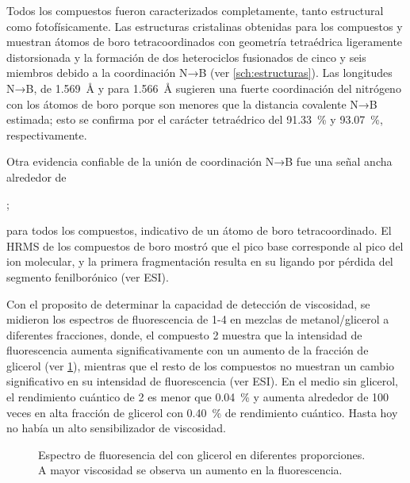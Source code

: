 


Todos los compuestos fueron caracterizados completamente, tanto estructural como fotofísicamente. Las estructuras cristalinas obtenidas para los compuestos  y  muestran átomos de boro tetracoordinados con geometría tetraédrica ligeramente distorsionada y la formación de dos heterociclos fusionados de cinco y seis miembros debido a la coordinación N→B (ver \cref{sch:estructuras}). Las longitudes N→B,  de \qty{1.569}{\angstrom} y para  \qty{1.566}{\angstrom} sugieren una fuerte coordinación del nitrógeno con los átomos de boro porque son menores que la distancia covalente N→B estimada; esto se confirma por el carácter tetraédrico del \qty{91.33}{\percent} y \qty{93.07}{\percent}, respectivamente.

Otra evidencia confiable de la unión de coordinación N→B fue una señal ancha alrededor de \begin{experimental}  ; \end{experimental} para todos los compuestos, indicativo de un átomo de boro tetracoordinado. El HRMS de los compuestos de boro mostró que el pico base corresponde al pico del ion molecular, y la primera fragmentación resulta en su ligando por pérdida del segmento fenilborónico (ver ESI). 


Con el proposito de determinar la capacidad de detección de viscosidad, se midieron los espectros de fluorescencia de 1-4 en mezclas de metanol/glicerol a diferentes fracciones, donde, el compuesto 2 muestra que la intensidad de fluorescencia aumenta significativamente con un aumento de la fracción de glicerol (ver \cref{fig:fluorescencia-glicerol}), mientras que el resto de los compuestos no muestran un cambio significativo en su intensidad de fluorescencia (ver ESI). En el medio sin glicerol, el rendimiento cuántico de 2 es menor que \qty{0.04}{\percent} y aumenta alrededor de 100 veces en alta fracción de glicerol con \qty{0.40}{\percent} de rendimiento cuántico. Hasta hoy no había un alto sensibilizador de viscosidad.

\begin{figure}
    \centering
    \label{fig:fluorescencia-glicerol}
    \caption{Espectro de fluoresencia del  con glicerol en diferentes proporciones. A mayor viscosidad se observa un aumento en la fluorescencia.}
\end{figure}

